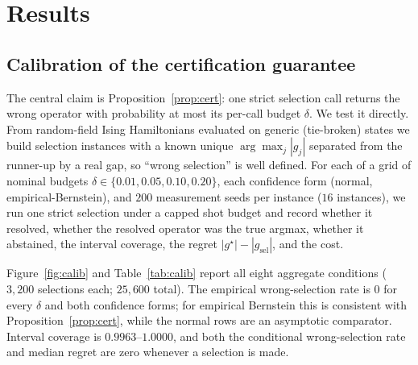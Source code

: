 \documentclass[aps,pra,reprint,superscriptaddress,nofootinbib,floatfix]{revtex4-2}
\begin{document}
\section{Results}
\label{sec:results}

\subsection{Calibration of the certification guarantee}
\label{sec:res-calib}

The central claim is Proposition~\ref{prop:cert}: one strict selection call returns the wrong operator with probability at most its per-call budget $\delta$. We test it directly. From random-field Ising Hamiltonians evaluated on generic (tie-broken) states we build selection instances with a known unique $\arg\max_j|g_j|$ separated from the runner-up by a real gap, so ``wrong selection'' is well defined. For each of a grid of nominal budgets $\delta\in\{0.01,0.05,0.10,0.20\}$, each confidence form (normal, empirical-Bernstein), and $200$ measurement seeds per instance ($16$ instances), we run one strict selection under a capped shot budget and record whether it resolved, whether the resolved operator was the true argmax, whether it abstained, the interval coverage, the regret $|g^\star|-|g_{\text{sel}}|$, and the cost.

Figure~\ref{fig:calib} and Table~\ref{tab:calib} report all eight aggregate conditions ($3{,}200$ selections each; $25{,}600$ total). The empirical wrong-selection rate is $0$ for every $\delta$ and both confidence forms; for empirical Bernstein this is consistent with Proposition~\ref{prop:cert}, while the normal rows are an asymptotic comparator. Interval coverage is $0.9963$--$1.0000$, and both the conditional wrong-selection rate and median regret are zero whenever a selection is made.
\end{document}
